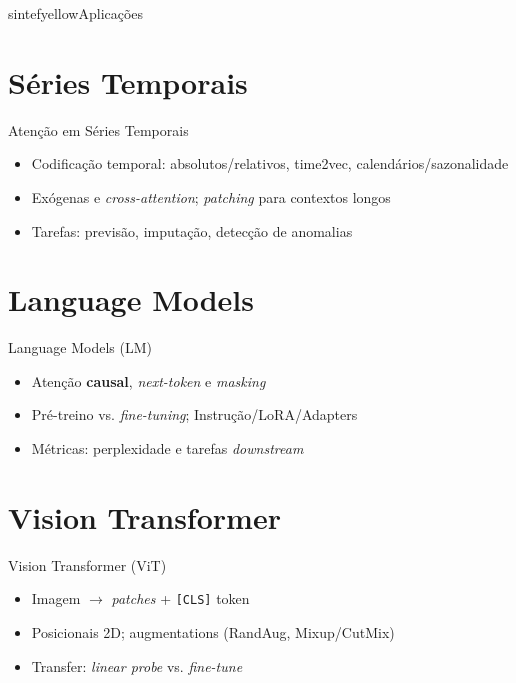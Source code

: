\documentclass{beamer}
\begin{document}
\begin{chapter}{sintefyellow}{Aplicações}\end{chapter}

\section{Séries Temporais}
\begin{frame}{Atenção em Séries Temporais}
	\begin{itemize}[<+->]
		\item Codificação temporal: absolutos/relativos, time2vec, calendários/sazonalidade
		\item Exógenas e \textit{cross-attention}; \textit{patching} para contextos longos
		\item Tarefas: previsão, imputação, detecção de anomalias
	\end{itemize}
\end{frame}

\section{Language Models}
\begin{frame}{Language Models (LM)}
	\begin{itemize}[<+->]
		\item Atenção \textbf{causal}, \textit{next-token} e \textit{masking}
		\item Pré-treino vs. \textit{fine-tuning}; Instrução/LoRA/Adapters
		\item Métricas: perplexidade e tarefas \textit{downstream}
	\end{itemize}
\end{frame}

\section{Vision Transformer}
\begin{frame}{Vision Transformer (ViT)}
	\begin{itemize}[<+->]
		\item Imagem $\rightarrow$ \textit{patches} + \texttt{[CLS]} token
		\item Posicionais 2D; augmentations (RandAug, Mixup/CutMix)
		\item Transfer: \textit{linear probe} vs. \textit{fine-tune}
	\end{itemize}
\end{frame}
\end{document}

